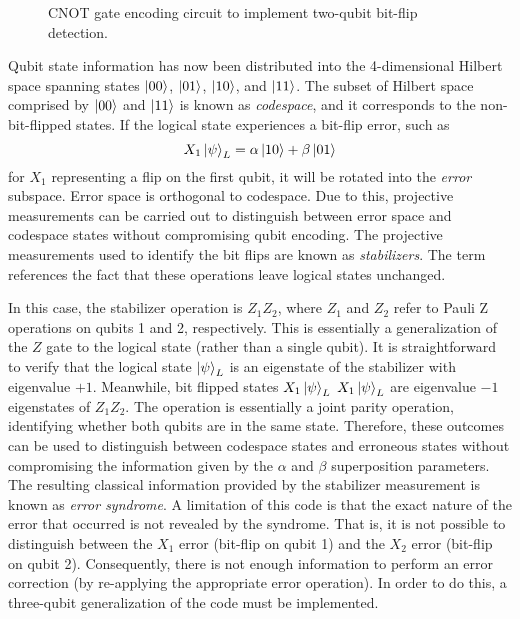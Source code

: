 \begin{figure}
    \centering
    \caption{CNOT gate encoding circuit to implement two-qubit bit-flip detection.}
    \label{fig:two_qub_enc}
\end{figure}
Qubit state information has now been distributed into the 4-dimensional Hilbert space spanning states $\ket{00}$, $\ket{01}$, $\ket{10}$, and $\ket{11}$. The subset of Hilbert space comprised by $\ket{00}$ and $\ket{11}$ is known as \textit{codespace}, and it corresponds to the non-bit-flipped states. If the logical state experiences a bit-flip error, such as
\begin{equation}
    X_1\ket{\psi}_L = \alpha\ket{10} + \beta\ket{01}
\end{equation}
for $X_1$ representing a flip on the first qubit, it will be rotated into the \textit{error} subspace. Error space is orthogonal to codespace. Due to this, projective measurements can be carried out to distinguish between error space and codespace states without compromising qubit encoding. The projective measurements used to identify the bit flips are known as \textit{stabilizers}. The term references the fact that these operations leave logical states unchanged. 

In this case, the stabilizer operation is $Z_1Z_2$, where $Z_1$ and $Z_2$ refer to Pauli Z operations on qubits 1 and 2, respectively. This is essentially a generalization of the $Z$ gate to the logical state (rather than a single qubit). It is straightforward to verify that the logical state $\ket{\psi}_L$ is an eigenstate of the stabilizer with eigenvalue $+1$. Meanwhile, bit flipped states $X_1\ket{\psi}_L$ $X_1\ket{\psi}_L$ are eigenvalue $-1$ eigenstates of $Z_1Z_2$. The operation is essentially a joint parity operation, identifying whether both qubits are in the same state. Therefore, these outcomes can be used to distinguish between codespace states and erroneous states without compromising the information given by the $\alpha$ and $\beta$ superposition parameters. The resulting classical information provided by the stabilizer measurement is known as \textit{error syndrome}. A limitation of this code is that the exact nature of the error that occurred is not revealed by the syndrome. That is, it is not possible to distinguish between the $X_1$ error (bit-flip on qubit 1) and the $X_2$ error (bit-flip on qubit 2). Consequently, there is not enough information to perform an error correction (by re-applying the appropriate error operation). In order to do this, a three-qubit generalization of the code must be implemented.

